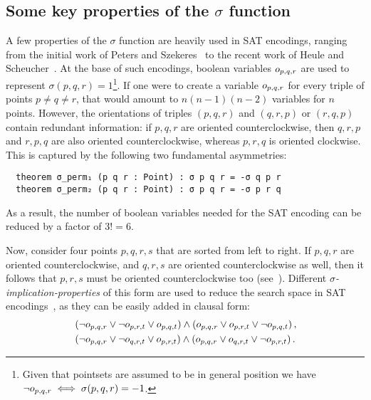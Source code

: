 \subsection{Some key properties of the $\sigma$ function}
A few properties of the $\sigma$ function are heavily used in SAT encodings, ranging from the initial work of Peters and Szekeres~\cite{szekeres_peters_2006} to the recent work of Heule and Scheucher~\cite{emptyHexagonNumber}. At the base of such encodings, boolean variables $\orvar_{p,q,r}$ are used to represent $\sigma(p, q, r) = 1$\footnote{Given that pointsets are assumed to be in general position we have $\neg \orvar_{p,q,r} \iff \sigma(p, q, r) = -1$.}. If one were to create a variable $\orvar_{p,q,r}$ for every triple of points $p \neq q \neq r$, that would amount to $n(n-1)(n-2)$ variables for $n$ points. However, the orientations of triples $(p, q, r)$ and $(q, r, p)$ or $(r, q, p)$ contain redundant information: if $p,q,r$ are oriented counterclockwise, then $q,r,p$ and $r,p,q$ are also oriented counterclockwise, whereas $p,r,q$ is oriented clockwise. This is captured by the following two fundamental asymmetries:
\begin{lstlisting}
  theorem σ_perm₁ (p q r : Point) : σ p q r = -σ q p r
  theorem σ_perm₂ (p q r : Point) : σ p q r = -σ p r q
\end{lstlisting}
As a result, the number of boolean variables needed for the SAT encoding can be reduced by a factor of $3! = 6$.

Now, consider four points $p, q, r, s$ that are sorted from left to right. If $p, q, r$ are oriented counterclockwise, and $q, r, s$ are oriented counterclockwise as well, then it follows that $p, r, s$ must be oriented counterclockwise too (see~). Different \emph{$\sigma$-implication-properties} of this form are used to reduce the search space in SAT encodings~\cite{emptyHexagonNumber,scheucherTwoDisjoint5holes2020,subercaseaux2023minimizing, szekeres_peters_2006}, as they can be easily added in clausal form:
\begin{align}
  &\left(\neg \orvar_{p, q, r} \lor \neg \orvar_{p, r, t} \lor \orvar_{p, q, t}\right) \land \left(\orvar_{p, q, r} \lor \orvar_{p, r, t} \lor  \neg \orvar_{p, q, t}\right), \\ 
  &\left(\neg \orvar_{p, q, r} \lor \neg \orvar_{q, r, t} \lor  \orvar_{p, r, t}\right) \land \left(\orvar_{p, q, r} \lor \orvar_{q, r, t} \lor  \neg \orvar_{p, r, t}\right).
\end{align}


